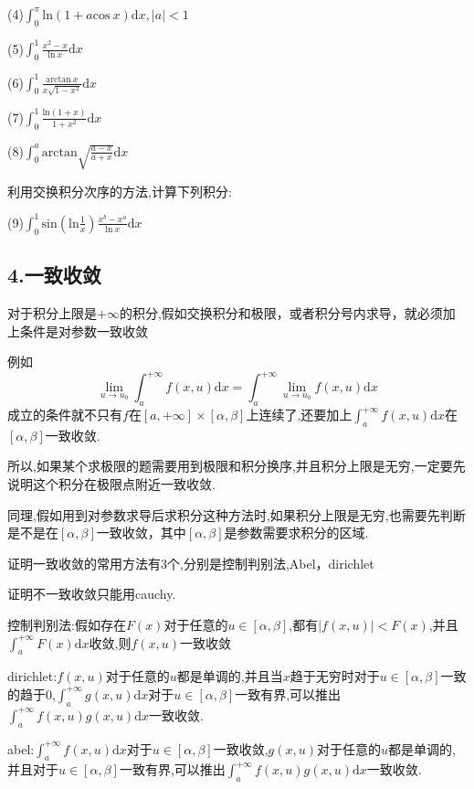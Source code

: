 \documentclass{ctexart}
\begin{document}
(4)$\int_{0}^{\pi}\mathrm{ln}(1+a\mathrm{cos}\ x)\mathrm{d}x,|a|<1$

(5)$\int_{0}^{1}\frac{x^{2}-x}{\mathrm{ln}\ x}\mathrm{d}x$

(6)$\int^{1}_{0}\frac{\mathrm{arctan}\ x}{x\sqrt{1-x^{2}}}\mathrm{d}x$

(7)$\int_{0}^{1}\frac{\mathrm{ln}(1+x)}{1+x^{2}}\mathrm{d}x$

(8)$\int_{0}^{a}\mathrm{arctan}\sqrt{\frac{a-x}{a+x}}\mathrm{d}x$

利用交换积分次序的方法,计算下列积分:

(9)$\int_{0}^{1}\mathrm{sin}(\mathrm{ln}\frac{1}{x})\frac{x^{b}-x^{a}}{\mathrm{ln}\ x}\mathrm{d}x$


\subsection*{4.一致收敛}


对于积分上限是$+\infty$的积分,假如交换积分和极限，或者积分号内求导，就必须加上条件是对参数一致收敛

例如$$\lim_{u\rightarrow u_{0}}\int_{a}^{+\infty}f(x,u)\mathrm{d}x=\int_{a}^{+\infty}\lim_{u\rightarrow u_{0}}f(x,u)\mathrm{d}x$$
成立的条件就不只有$f$在$[a,+\infty]\times[\alpha,\beta]$上连续了,还要加上$\int_{a}^{+\infty}f(x,u)\mathrm{d}x$在$[\alpha,\beta]$一致收敛.

所以,如果某个求极限的题需要用到极限和积分换序,并且积分上限是无穷,一定要先说明这个积分在极限点附近一致收敛.

同理,假如用到对参数求导后求积分这种方法时,如果积分上限是无穷,也需要先判断是不是在$[\alpha,\beta]$一致收敛，其中$[\alpha,\beta]$是参数需要求积分的区域.



证明一致收敛的常用方法有3个,分别是控制判别法,Abel，dirichlet

证明不一致收敛只能用cauchy.

控制判别法:假如存在$F(x)$对于任意的$u\in[\alpha,\beta]$,都有$|f(x,u)|<F(x)$,并且$\int_{a}^{+\infty}F(x)\mathrm{d}x$收敛,则$f(x,u)$一致收敛

dirichlet:$f(x,u)$对于任意的$u$都是单调的,并且当$x$趋于无穷时对于$u\in[\alpha,\beta]$一致的趋于0,$\int_{a}^{+\infty}g(x,u)\mathrm{d}x$对于$u\in[\alpha,\beta]$一致有界,可以推出$\int_{a}^{+\infty}f(x,u)g(x,u)\mathrm{d}x$一致收敛.

abel:$\int_{a}^{+\infty}f(x,u)\mathrm{d}x$对于$u\in[\alpha,\beta]$一致收敛,$g(x,u)$对于任意的$u$都是单调的,并且对于$u\in[\alpha,\beta]$一致有界,可以推出$\int_{a}^{+\infty}f(x,u)g(x,u)\mathrm{d}x$一致收敛.
\end{document}
